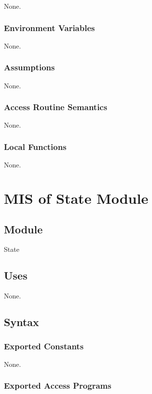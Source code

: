 \documentclass[12pt, titlepage]{article}
\begin{document}
None.

\subsubsection{Environment Variables}

None.

\subsubsection{Assumptions}

None.

\subsubsection{Access Routine Semantics}

None.

\subsubsection{Local Functions}

None.

\newpage

\section{MIS of State Module} \label{Module_state}

\subsection{Module}

State

\subsection{Uses}
None.

\subsection{Syntax}

\subsubsection{Exported Constants}
None.

\subsubsection{Exported Access Programs}
\end{document}
